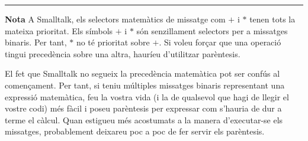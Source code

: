 
\newpage

\noindent
\rule{\textwidth}{2pt}
\noindent
\textbf{Nota} A Smalltalk, els selectors matemàtics de missatge com \textsf{$+$} i \textsf{$*$} tenen tots la mateixa prioritat. Els símbols \textsf{$+$} i \textsf{$*$} són senzillament selectors per a missatges binaris. Per tant, \textsf{$*$} no té prioritat sobre \textsf{$+$}. Si voleu forçar que una operació tingui precedència sobre una altra, hauríeu d'utilitzar parèntesis. 

\noindent
El fet que Smalltalk no segueix la precedència matemàtica pot ser confús al començament. Per tant, si teniu múltiples missatges binaris representant una expressió matemàtica, feu la vostra vida (i la de qualsevol que hagi de llegir el vostre codi) més fàcil i poseu parèntesis per expressar com s'hauria de dur a terme el càlcul. Quan estigueu més acostumats a la manera d'executar-se els missatges, probablement deixareu poc a poc de fer servir els parèntesis.

